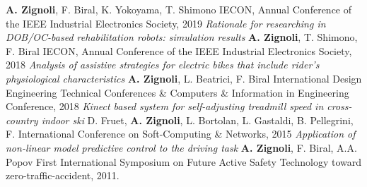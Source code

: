 \documentclass[helvetica,openbib,logo,notitle,flagCMYK,totpages]{europecv}
\begin{document}
\begin{europecv}
{	       \textbf{A. Zignoli}, F. Biral, K. Yokoyama, T. Shimono \newline
	       IECON, Annual Conference of the IEEE Industrial Electronics Society, 2019
	       \newline
	       \newline
	       \emph{Rationale for researching in DOB/OC-based rehabilitation robots: simulation results}             \newline
	       \textbf{A. Zignoli}, T. Shimono, F. Biral \newline
	       IECON, Annual Conference of the IEEE Industrial Electronics Society, 2018
	       \newline
	       \newline
	       \emph{Analysis of assistive strategies for electric bikes that include rider's physiological characteristics}             \newline
	       \textbf{A. Zignoli}, L. Beatrici, F. Biral \newline
	       International Design Engineering Technical Conferences \& Computers \& Information in Engineering Conference, 2018 \newline 
	       \newline
	       \emph{Kinect based system for self-adjusting treadmill speed in cross-country indoor ski}             \newline
	       D. Fruet, \textbf{A. Zignoli}, L. Bortolan, L. Gastaldi, B. Pellegrini, F.\newline
	       International Conference on Soft-Computing \& Networks, 2015 \newline 
	       \newline
	       \emph{Application of non-linear model predictive control to the driving task}             \newline
	       \textbf{A. Zignoli}, F. Biral, A.A. Popov \newline
	       First International Symposium on Future Active Safety Technology toward zero-traffic-accident, 2011. 
        }
\end{europecv}
\end{document}
